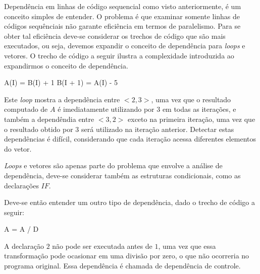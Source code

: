 Dependência em linhas de código sequencial como visto anteriormente, é um
conceito simples de entender.
O problema é que examinar somente linhas de códigos sequênciais não garante 
eficiência em termos de paralelismo. 
Para se obter tal eficiência deve-se considerar os trechos de
código que são mais executados, ou seja, devemos expandir o conceito de
dependência para \textit{loops} e vetores.
O trecho de código a seguir ilustra a complexidade introduzida ao expandirmos o
conceito de dependência.

\begin{algorithm}
        \begin{algorithmic}[1]
                \STATE A(I) = B(I) + 1
                \STATE B(I + 1) = A(I) - 5
                \ENDFOR
        \end{algorithmic}
\end{algorithm}

Este \textit{loop} mostra a dependência entre $<2,3>$, uma vez que o
resultado computado de $A$ é imediatamente utilizando por $3$ em todas as
iterações, e também a dependêndia entre $<3,2>$ exceto na primeira iteração,
uma vez que o resultado obtido por $3$ será utilizado na iteração anterior.
Detectar estas dependências é difícil, considerando que cada iteração acessa 
diferentes elementos do vetor.

\textit{Loops} e vetores são apenas parte do problema que envolve a análise de
dependência, deve-se considerar também as estruturas condicionais, como as
declarações $IF$.

Deve-se então entender um outro tipo de dependência, dado o trecho de
código a seguir:

\begin{algorithm}
        \begin{algorithmic}[1]
        \STATE A = A / D
        \ENDIF
        \end{algorithmic}
\end{algorithm}

A declaração $2$ não pode ser executada antes de $1$, uma vez que essa
transformação pode ocasionar em uma divisão por zero, o que não ocorreria no
programa original. Essa dependência é chamada de dependência de controle.




